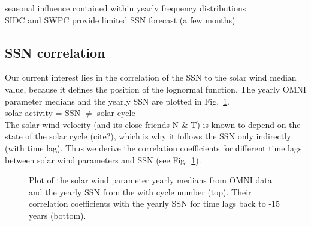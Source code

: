 seasonal influence contained within yearly frequency distributions\\

SIDC and SWPC provide limited SSN forecast (a few months)\\

\subsection{SSN correlation}
Our current interest lies in the correlation of the SSN to the solar wind median value, because it defines the position of the lognormal function. The yearly OMNI parameter medians and the yearly SSN are plotted in Fig.~\ref{fig:OMNI_yearly_ssn_correlation_c_plot}.\\

solar activity = SSN $\neq$ solar cycle\\
The solar wind velocity (and its close friends N \& T) is known to depend on the state of the solar cycle (cite?), which is why it follows the SSN only indirectly (with time lag). Thus we derive the correlation coefficients for different time lags between solar wind parameters and SSN (see Fig.~\ref{fig:OMNI_yearly_ssn_correlation_c_plot}).\\
\begin{figure}
	\caption{Plot of the solar wind parameter yearly medians from OMNI data and the yearly SSN from the \citet{sidc} with cycle number (top). Their correlation coefficients with the yearly SSN for time lags back to -15 years (bottom).}
	\label{fig:OMNI_yearly_ssn_correlation_c_plot}
\end{figure}


